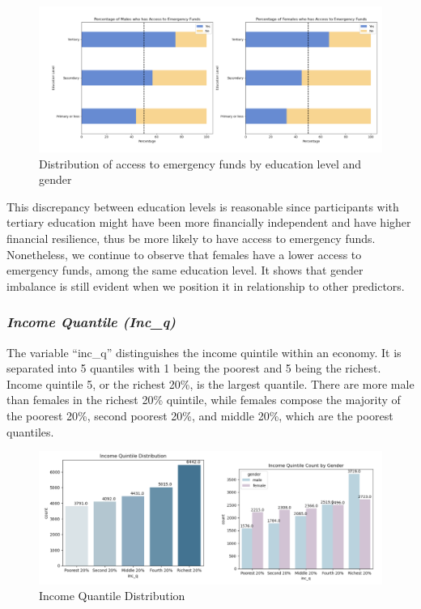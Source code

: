 \documentclass[12pt]{article}
\begin{document}
\begin{figure}

{\centering \includegraphics[width=1\linewidth]{graphs/f24_graph5} 

}

\caption{Distribution of access to emergency funds by education level and gender}\label{fig:unnamed-chunk-8}
\end{figure}

This discrepancy between education levels is reasonable since
participants with tertiary education might have been more financially
independent and have higher financial resilience, thus be more likely to
have access to emergency funds. Nonetheless, we continue to observe that
females have a lower access to emergency funds, among the same education
level. It shows that gender imbalance is still evident when we position
it in relationship to other predictors.

\hypertarget{income-quantile-inc_q}{%
\subsubsection{\texorpdfstring{\emph{Income Quantile
(Inc\_q)}}{Income Quantile (Inc\_q)}}\label{income-quantile-inc_q}}

The variable ``inc\_q'' distinguishes the income quintile within an
economy. It is separated into 5 quantiles with 1 being the poorest and 5
being the richest. Income quintile 5, or the richest 20\%, is the
largest quantile. There are more male than females in the richest 20\%
quintile, while females compose the majority of the poorest 20\%, second
poorest 20\%, and middle 20\%, which are the poorest quantiles.

\begin{figure}

{\centering \includegraphics[width=1\linewidth]{graphs/income_graph6} 

}

\caption{Income Quantile Distribution}\label{fig:unnamed-chunk-9}
\end{figure}
\end{document}
